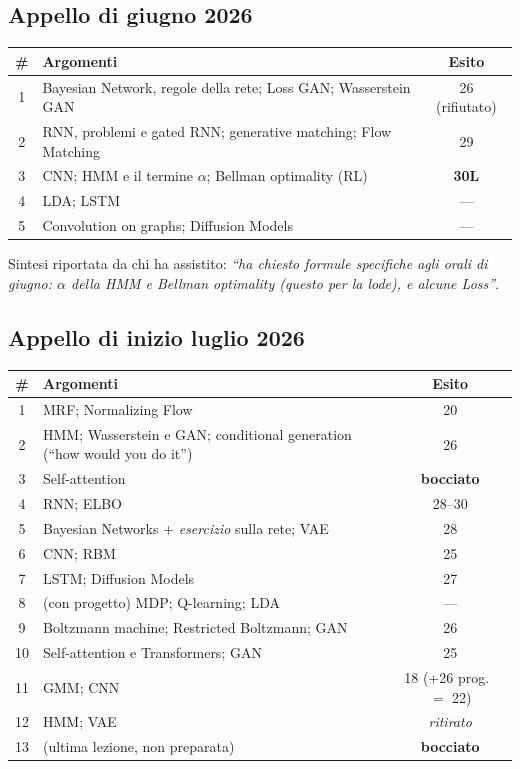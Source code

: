 \subsection*{Appello di giugno 2026}

\begin{center}
\begin{tabular}{clc}
\toprule
\# & \textbf{Argomenti} & \textbf{Esito} \\
\midrule
1 & Bayesian Network, regole della rete; Loss GAN; Wasserstein GAN & 26 (rifiutato) \\
2 & RNN, problemi e gated RNN; generative matching; Flow Matching & 29 \\
3 & CNN; HMM e il termine $\alpha$; Bellman optimality (RL) & \textbf{30L} \\
4 & LDA; LSTM & --- \\
5 & Convolution on graphs; Diffusion Models & --- \\
\bottomrule
\end{tabular}
\end{center}
\noindent Sintesi riportata da chi ha assistito: \emph{``ha chiesto formule specifiche agli orali di giugno: $\alpha$ della HMM e Bellman optimality (questo per la lode), e alcune Loss''}.

\subsection*{Appello di inizio luglio 2026}

\begin{center}
\begin{tabular}{clc}
\toprule
\# & \textbf{Argomenti} & \textbf{Esito} \\
\midrule
1 & MRF; Normalizing Flow & 20 \\
2 & HMM; Wasserstein e GAN; conditional generation (``how would you do it'') & 26 \\
3 & Self-attention & \textbf{bocciato} \\
4 & RNN; ELBO & 28--30 \\
5 & Bayesian Networks + \emph{esercizio} sulla rete; VAE & 28 \\
6 & CNN; RBM & 25 \\
7 & LSTM; Diffusion Models & 27 \\
8 & (con progetto) MDP; Q-learning; LDA & --- \\
9 & Boltzmann machine; Restricted Boltzmann; GAN & 26 \\
10 & Self-attention e Transformers; GAN & 25 \\
11 & GMM; CNN & 18 (+26 prog.\ $=$ 22) \\
12 & HMM; VAE & \emph{ritirato} \\
13 & (ultima lezione, non preparata) & \textbf{bocciato} \\
\bottomrule
\end{tabular}
\end{center}

